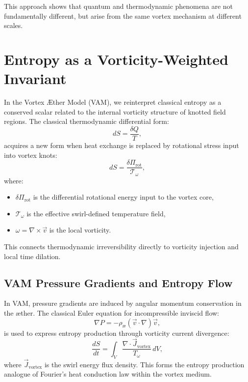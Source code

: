 This approach shows that quantum and thermodynamic phenomena are not fundamentally different, but arise from the same vortex mechanism at different scales.

\section*{Entropy as a Vorticity-Weighted Invariant}\label{sec:entropy_vorticity}

In the Vortex \AE{}ther Model (VAM), we reinterpret classical entropy as a conserved scalar related to the internal vorticity structure of knotted field regions. The classical thermodynamic differential form:
\begin{equation}
    dS = \frac{\delta Q}{T},
\end{equation}
acquires a new form when heat exchange is replaced by rotational stress input into vortex knots:
\begin{equation}
    dS = \frac{\delta \Pi_\text{rot}}{\mathcal{T}_\omega},
\end{equation}
where:
\begin{itemize}
    \item $\delta \Pi_\text{rot}$ is the differential rotational energy input to the vortex core,
    \item $\mathcal{T}_\omega$ is the effective swirl-defined temperature field,
    \item $\omega = \nabla \times \vec{v}$ is the local vorticity.
\end{itemize}
This connects thermodynamic irreversibility directly to vorticity injection and local time dilation.

\subsection*{VAM Pressure Gradients and Entropy Flow}

In VAM, pressure gradients are induced by angular momentum conservation in the \ae{}ther. The classical Euler equation for incompressible inviscid flow:
\begin{equation}
    \nabla P = -\rho_\text{\ae} (\vec{v} \cdot \nabla) \vec{v},
\end{equation}
is used to express entropy production through vorticity current divergence:
\begin{equation}
    \frac{dS}{dt} = \int_V \frac{\nabla \cdot \vec{J}_\text{vortex}}{T_\omega} \, dV,
\end{equation}
where $\vec{J}_\text{vortex}$ is the swirl energy flux density. This forms the entropy production analogue of Fourier's heat conduction law within the vortex medium.

